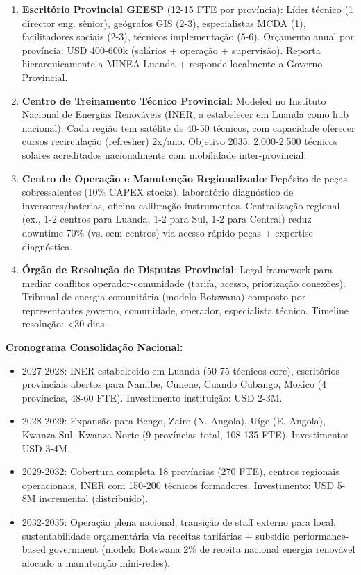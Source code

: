 \documentclass[12pt, a4paper]{article}
\begin{document}
\begin{enumerate}
\item \textbf{Escritório Provincial GEESP} (12-15 FTE por província): Líder técnico (1 director eng. sênior), geógrafos GIS (2-3), especialistas MCDA (1), facilitadores sociais (2-3), técnicos implementação (5-6). Orçamento anual por província: USD 400-600k (salários + operação + supervisão). Reporta hierarquicamente a MINEA Luanda + responde localmente a Governo Provincial.

\item \textbf{Centro de Treinamento Técnico Provincial}: Modeled no Instituto Nacional de Energias Renováveis (INER, a estabelecer em Luanda como hub nacional). Cada região tem satélite de 40-50 técnicos, com capacidade oferecer cursos recirculação (refresher) 2x/ano. Objetivo 2035: 2.000-2.500 técnicos solares acreditados nacionalmente com mobilidade inter-provincial.

\item \textbf{Centro de Operação e Manutenção Regionalizado}: Depósito de peças sobressalentes (10\% CAPEX stocks), laboratório diagnóstico de inversores/baterias, oficina calibração instrumentos. Centralização regional (ex., 1-2 centros para Luanda, 1-2 para Sul, 1-2 para Central) reduz downtime 70\% (vs. sem centros) via acesso rápido peças + expertise diagnóstica.

\item \textbf{Órgão de Resolução de Disputas Provincial}: Legal framework para mediar conflitos operador-comunidade (tarifa, acesso, priorização conexões). Tribunal de energia comunitária (modelo Botswana) composto por representantes governo, comunidade, operador, especialista técnico. Timeline resolução: <30 dias.
\end{enumerate}

\textbf{Cronograma Consolidação Nacional:}
\begin{itemize}
\item 2027-2028: INER estabelecido em Luanda (50-75 técnicos core), escritórios provinciais abertos para Namibe, Cunene, Cuando Cubango, Moxico (4 províncias, 48-60 FTE). Investimento instituição: USD 2-3M.

\item 2028-2029: Expansão para Bengo, Zaire (N. Angola), Uíge (E. Angola), Kwanza-Sul, Kwanza-Norte (9 províncias total, 108-135 FTE). Investimento: USD 3-4M.

\item 2029-2032: Cobertura completa 18 províncias (270 FTE), centros regionais operacionais, INER com 150-200 técnicos formadores. Investimento: USD 5-8M incremental (distribuído).

\item 2032-2035: Operação plena nacional, transição de staff externo para local, sustentabilidade orçamentária via receitas tarifárias + subsídio performance-based government (modelo Botswana 2\% de receita nacional energia renovável alocado a manutenção mini-redes).
\end{itemize}
\end{document}
